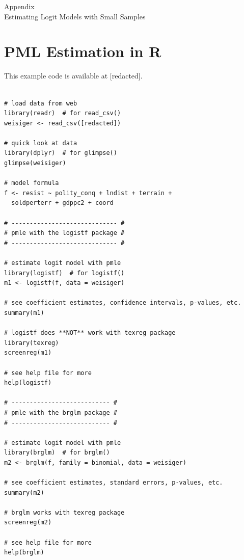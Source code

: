 \documentclass[12pt]{article}
\begin{document}
\newpage
\begin{appendix}
\begin{center}
{\LARGE Appendix}\\
\vspace{3mm}
{\large Estimating Logit Models with Small Samples}\\\vspace{2mm}
\end{center}

\section{PML Estimation in R}\label{sec:pmle-in-R}

This example code is available at [redacted].

\begin{footnotesize}
\begin{verbatim}

# load data from web
library(readr)  # for read_csv()
weisiger <- read_csv([redacted])

# quick look at data
library(dplyr)  # for glimpse()
glimpse(weisiger)

# model formula
f <- resist ~ polity_conq + lndist + terrain +
  soldperterr + gdppc2 + coord

# ----------------------------- #
# pmle with the logistf package #
# ----------------------------- #

# estimate logit model with pmle
library(logistf)  # for logistf()
m1 <- logistf(f, data = weisiger)

# see coefficient estimates, confidence intervals, p-values, etc.
summary(m1)

# logistf does **NOT** work with texreg package
library(texreg)
screenreg(m1)

# see help file for more
help(logistf)

# --------------------------- #
# pmle with the brglm package #
# --------------------------- #

# estimate logit model with pmle
library(brglm)  # for brglm()
m2 <- brglm(f, family = binomial, data = weisiger)

# see coefficient estimates, standard errors, p-values, etc.
summary(m2)

# brglm works with texreg package
screenreg(m2)

# see help file for more
help(brglm)
\end{verbatim}
\end{footnotesize}


\end{appendix}
\end{document}
